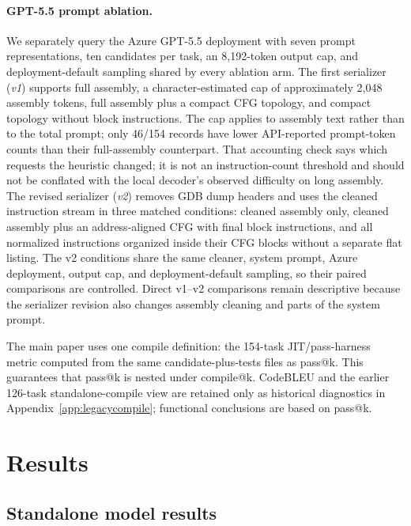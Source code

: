 \documentclass[11pt]{article}
\begin{document}
\paragraph{GPT-5.5 prompt ablation.} We separately query the Azure GPT-5.5 deployment with seven prompt representations, ten candidates per task, an 8{,}192-token output cap, and deployment-default sampling shared by every ablation arm. The first serializer (\emph{v1}) supports full assembly, a character-estimated cap of approximately 2{,}048 assembly tokens, full assembly plus a compact CFG topology, and compact topology without block instructions. The cap applies to assembly text rather than to the total prompt; only 46/154 records have lower API-reported prompt-token counts than their full-assembly counterpart. That accounting check says which requests the heuristic changed; it is not an instruction-count threshold and should not be conflated with the local decoder's observed difficulty on long assembly. The revised serializer (\emph{v2}) removes GDB dump headers and uses the cleaned instruction stream in three matched conditions: cleaned assembly only, cleaned assembly plus an address-aligned CFG with final block instructions, and all normalized instructions organized inside their CFG blocks without a separate flat listing. The v2 conditions share the same cleaner, system prompt, Azure deployment, output cap, and deployment-default sampling, so their paired comparisons are controlled. Direct v1--v2 comparisons remain descriptive because the serializer revision also changes assembly cleaning and parts of the system prompt.

The main paper uses one compile definition: the 154-task JIT/pass-harness metric computed from the same candidate-plus-tests files as pass@k. This guarantees that pass@k is nested under compile@k. CodeBLEU and the earlier 126-task standalone-compile view are retained only as historical diagnostics in Appendix~\ref{app:legacycompile}; functional conclusions are based on pass@k.

\section{Results}

\subsection{Standalone model results}
\end{document}
